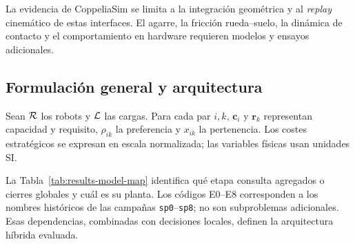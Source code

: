 La evidencia de CoppeliaSim se limita a la integración geométrica y al
\emph{replay} cinemático de estas interfaces. El agarre, la fricción
rueda--suelo, la dinámica de contacto y el comportamiento en hardware requieren
modelos y ensayos adicionales.

\subsection{Formulación general y arquitectura}
\label{subsec:common-formulation}

Sean \(\mathcal{R}\) los robots y \(\mathcal{L}\) las cargas. Para cada par \(i,k\), \(\boldsymbol c_i\) y \(\boldsymbol r_k\) representan capacidad y requisito, \(\rho_{ik}\) la preferencia y \(x_{ik}\) la pertenencia. Los costes estratégicos se expresan en escala normalizada; las variables físicas usan unidades SI.

La Tabla~\ref{tab:results-model-map} identifica qué etapa consulta agregados o cierres globales y cuál es su planta. Los códigos E0--E8 corresponden a los nombres históricos de las campañas \texttt{sp0}--\texttt{sp8}; no son subproblemas adicionales. Esas dependencias, combinadas con decisiones locales, definen la arquitectura híbrida evaluada.

